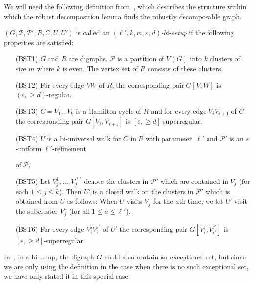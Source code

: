 \documentclass{memo-l}
\def\COMMENT#1{}
\def\cP{\mathcal{P}}
\def\eps{\varepsilon}
\numberwithin{section}{chapter}
\numberwithin{equation}{section}
\numberwithin{firstthm}{section}
\numberwithin{figure}{section}
\begin{document}
{We will need the following definition from~\cite{Kelly}, which describes the structure within which the robust decomposition lemma
finds the robustly decomposable graph.%
\COMMENT{Deryk added sentence}
$(G,\cP,\cP',R,C,U,U')$ is called an \emph{$(\ell',k,m,\eps,d)$-bi-setup} if the following properties are satisfied:
\begin{itemize}
\item [(BST1)] $G$ and $R$ are digraphs. $\mathcal{P}$ is a partition of $V(G)$ into
$k$ clusters of size $m$ where $k$ is even. The vertex set of $R$ consists of these clusters.
\item[(BST2)] For every edge $VW$ of $R$, the corresponding pair $G[V,W]$ is $(\eps,\ge d)$-regular.
\item[(BST3)] $C=V_1\dots V_{k}$ is a Hamilton cycle of $R$ and for every edge $V_iV_{i+1}$ of $C$ the corresponding pair $G[V_i,V_{i+1}]$ is $[\eps,\ge d]$-superregular.
\item[(BST4)] $U$ is a bi-universal walk for $C$ in $R$ with parameter~$\ell'$ and $\cP'$ is an $\eps$-uniform $\ell'$-refinement%
   \COMMENT{It was decided by DK+DO we need this notion of refinement here}
of $\cP$.
\item[(BST5)] Let $V_j^1,\dots,V_j^{\ell'}$ denote the clusters in $\cP'$ which are contained
in $V_j$ (for each $1\le j\le k$). Then $U'$ is a closed walk on the clusters in $\cP'$ which is obtained from $U$ as follows:
When $U$ visits $V_j$ for the $a$th time, we let $U'$ visit the subcluster $V_j^a$ (for all $1\le a\le \ell'$).
\item[(BST6)] For every edge $V_{i}^jV_{i'}^{j'}$ of $U'$ the corresponding pair $G[V_{i}^j,V_{i'}^{j'}]$ is $[\eps,\ge d]$-superregular.%
	\COMMENT{AL: added more details}
\end{itemize}
In~\cite{Kelly}, in a bi-setup, the digraph $G$ could also contain an exceptional set, but since we are only using
the definition in the case when there is no such exceptional set, we have only stated it in this special case.

}
\end{document}
